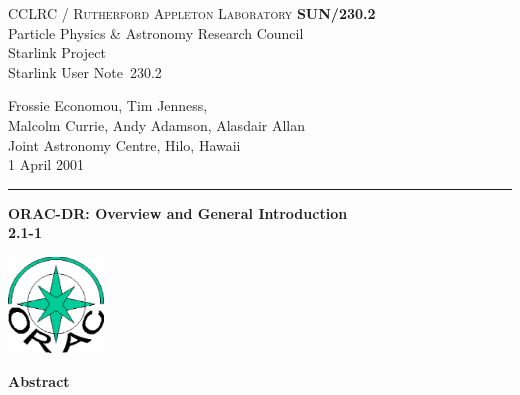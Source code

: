 \documentclass[twoside,11pt]{article}
\newcommand{\stardoccategory}  {Starlink User Note}
\newcommand{\stardocinitials}  {SUN}
\newcommand{\stardocnumber}    {230.2}
\newcommand{\stardocauthors}   {Frossie Economou, Tim Jenness,\\ Malcolm
  Currie, Andy Adamson, Alasdair Allan\\
Joint Astronomy Centre, Hilo, Hawaii}
\newcommand{\stardocdate}      {1 April 2001}
\newcommand{\stardoctitle}     {ORAC-DR: Overview and General Introduction}
\newcommand{\stardocversion}   {2.1-1}
\newcommand{\stardocmanual}    {}
\newcommand{\stardocname}{\stardocinitials /\stardocnumber}
\newenvironment{latexonly}{}{}
\renewcommand{\_}{\texttt{\symbol{95}}}
\begin{document}
\thispagestyle{empty}

\begin{latexonly}
   CCLRC / \textsc{Rutherford Appleton Laboratory} \hfill \textbf{\stardocname}\\
   {\large Particle Physics \& Astronomy Research Council}\\
   {\large Starlink Project\\}
   {\large \stardoccategory\ \stardocnumber}
   \begin{flushright}
   \stardocauthors\\
   \stardocdate
   \end{flushright}
   \vspace{-4mm}
   \rule{\textwidth}{0.5mm}
   \vspace{5mm}
   \begin{center}
   {\Huge\textbf{\stardoctitle \\ [2.5ex]}}
   {\LARGE\textbf{\stardocversion \\ [4ex]}}
   {\Huge\textbf{\stardocmanual}}
   \end{center}
   \vspace{5mm}

\begin{center}
\includegraphics[width=1.0in]{sun230_logo.eps}
\end{center}

   \vspace{10mm}
   \begin{center}
      {\Large\textbf{Abstract}}
   \end{center}
\end{latexonly}
\end{document}
